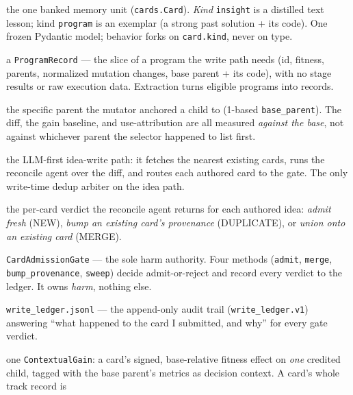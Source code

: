 \documentclass[11pt]{article}
\newcommand{\code}[1]{\texttt{\small #1}}
\begin{document}
\begingroup
\setlength{\parskip}{0pt}
\begin{description}[leftmargin=1.4em, itemsep=1.5pt, parsep=0pt, style=unboxed]
  \item[\textcolor{cardblue}{Card}] the one banked memory unit
    (\code{cards.Card}). \emph{Kind} \code{insight} is a distilled text lesson;
    kind \code{program} is an exemplar (a strong past solution + its code). One
    frozen Pydantic model; behavior forks on \code{card.kind}, never on type.
  \item[\textcolor{cardblue}{Record}] a \code{ProgramRecord} --- the slice of a
    program the write path needs (id, fitness, parents, normalized mutation
    changes, base parent + its code), with no stage results or raw execution
    data. Extraction turns eligible programs into records.
  \item[\textcolor{cardblue}{Base parent}] the specific parent the mutator
    anchored a child to (1-based \code{base\_parent}). The diff, the gain
    baseline, and use-attribution are all measured \emph{against the base}, not
    against whichever parent the selector happened to list first.
  \item[\textcolor{evgreen}{Librarian}] the LLM-first idea-write path: it fetches
    the nearest existing cards, runs the reconcile agent over the diff, and routes
    each authored card to the gate. The only write-time dedup arbiter on the idea
    path.
  \item[\textcolor{evgreen}{Reconcile (NEW / DUPLICATE / MERGE)}] the per-card
    verdict the reconcile agent returns for each authored idea: \emph{admit fresh}
    (NEW), \emph{bump an existing card's provenance} (DUPLICATE), or \emph{union
    onto an existing card} (MERGE).
  \item[\textcolor{harmred}{Admission gate}] \code{CardAdmissionGate} --- the sole
    harm authority. Four methods (\code{admit}, \code{merge},
    \code{bump\_provenance}, \code{sweep}) decide admit-or-reject and record every
    verdict to the ledger. It owns \emph{harm}, nothing else.
  \item[\textcolor{harmred}{Write ledger}] \code{write\_ledger.jsonl} --- the
    append-only audit trail (\code{write\_ledger.v1}) answering ``what happened to
    the card I submitted, and why'' for every gate verdict.
  \item[\textcolor{cardblue}{Gain event}] one \code{ContextualGain}: a card's
    signed, base-relative fitness effect on \emph{one} credited child, tagged with
    the base parent's metrics as decision context. A card's whole track record is

\end{description}
\end{document}
